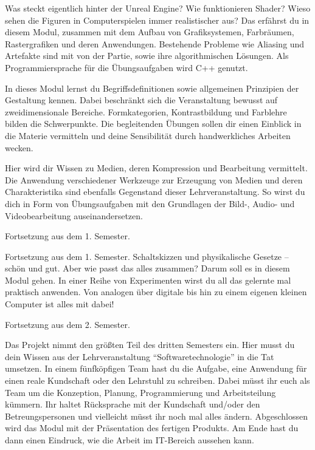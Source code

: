 Was steckt eigentlich hinter der Unreal Engine? Wie funktionieren Shader?
Wieso sehen die Figuren in Computerspielen immer realistischer aus?
Das erfährst du in diesem Modul, zusammen mit dem Aufbau von Grafiksystemen, Farbräumen, Rastergrafiken und deren Anwendungen.
Bestehende Probleme wie Aliasing und Artefakte sind mit von der Partie, sowie ihre algorithmischen Lösungen.
Als Programmiersprache für die Übungsaufgaben wird C++ genutzt.

In dieses Modul lernst du Begriffsdefinitionen sowie allgemeinen Prinzipien der Gestaltung kennen.
Dabei beschränkt sich die Veranstaltung bewusst auf zweidimensionale Bereiche.
Formkategorien, Kontrastbildung und Farblehre bilden die Schwerpunkte.
Die begleitenden Übungen sollen dir einen Einblick in die Materie vermitteln und deine Sensibilität durch handwerkliches Arbeiten wecken.

Hier wird dir Wissen zu Medien, deren Kompression und Bearbeitung vermittelt.
Die Anwendung verschiedener Werkzeuge zur Erzeugung von Medien und deren Charakteristika sind ebenfalls Gegenstand dieser Lehrveranstaltung.
So wirst du dich in Form von Übungsaufgaben mit den Grundlagen der Bild-, Audio- und Videobearbeitung auseinandersetzen.

Fortsetzung aus dem 1. Semester.

Fortsetzung aus dem 1. Semester. Schaltskizzen und physikalische Gesetze -- schön und gut. Aber wie passt das alles zusammen?
Darum soll es in diesem Modul gehen. In einer Reihe von Experimenten wirst du all das gelernte mal praktisch anwenden.
Von analogen über digitale bis hin zu einem eigenen kleinen Computer ist alles mit dabei!

\newpage


Fortsetzung aus dem 2. Semester.

Das Projekt nimmt den größten Teil des dritten Semesters ein.
Hier musst du dein Wissen aus der Lehrveranstaltung \enquote{Softwaretechnologie} in die Tat umsetzen.
In einem fünfköpfigen Team hast du die Aufgabe, eine Anwendung für einen reale Kundschaft oder den Lehrstuhl zu schreiben.
Dabei müsst ihr euch als Team um die Konzeption, Planung, Programmierung und Arbeitsteilung kümmern.
Ihr haltet Rücksprache mit der Kundschaft und/oder den Betreungspersonen und vielleicht müsst ihr noch mal alles ändern.
Abgeschlossen wird das Modul mit der Präsentation des fertigen Produkts.
Am Ende hast du dann einen Eindruck, wie die Arbeit im IT-Bereich aussehen kann.

